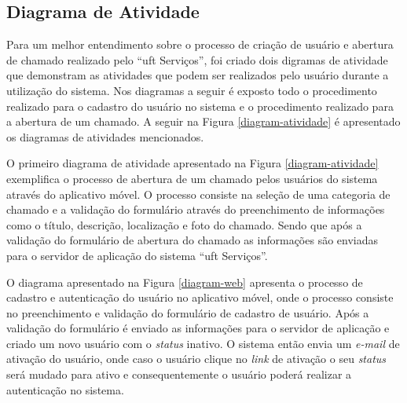 \subsection*{Diagrama de Atividade}

\noindent Para um melhor entendimento sobre o processo de criação de usuário e abertura de chamado realizado pelo ``\acrshort{uft} Serviços'', foi criado dois digramas de atividade que demonstram as atividades que podem ser realizados pelo usuário durante a utilização do sistema. Nos diagramas a seguir é exposto todo o procedimento realizado para o cadastro do usuário no sistema e o procedimento realizado para a abertura de um chamado. A seguir na Figura \ref{diagram-atividade} é apresentado os diagramas de atividades mencionados.

O primeiro diagrama de atividade apresentado na Figura \ref{diagram-atividade} exemplifica o processo de abertura de um chamado pelos usuários do sistema através do aplicativo móvel. O processo consiste na seleção de uma categoria de chamado e a validação do formulário através do preenchimento de informações como o título, descrição, localização e foto do chamado. Sendo que após a validação do formulário de abertura do chamado as informações são enviadas para o servidor de aplicação do sistema ``\acrshort{uft} Serviços''.

O diagrama apresentado na Figura \ref{diagram-web} apresenta o processo de cadastro e autenticação do usuário no aplicativo móvel, onde o processo consiste no preenchimento e validação do formulário de cadastro de usuário. Após a validação do formulário é enviado as informações para o servidor de aplicação e criado um novo usuário com o \textit{status} inativo. O sistema então envia um \textit{e-mail} de ativação do usuário, onde caso o usuário clique no \textit{link} de ativação o seu \textit{status} será mudado para ativo e consequentemente o usuário poderá realizar a autenticação no sistema.

